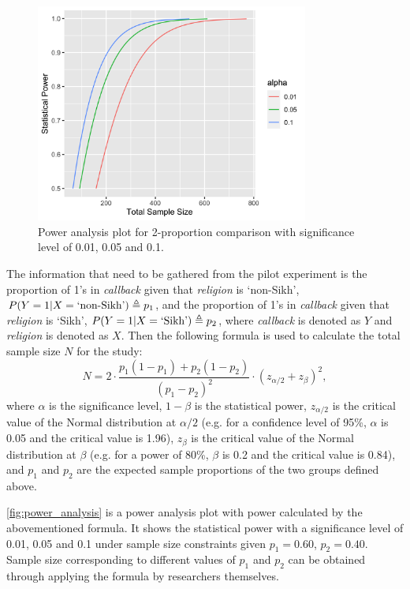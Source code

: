 \documentclass[11pt]{article}
\begin{document}
\begin{figure}[!b] 
    \centering
    \includegraphics[width=0.8\textwidth]{../../Plots/power_analysis.png}
    \caption{Power analysis plot for 2-proportion comparison with significance level of 0.01, 0.05 and 0.1.}
    \label{fig:power_analysis}
\end{figure} 


The information that need to be gathered from the pilot experiment is the proportion of 1's in 
\textit{callback} given that \textit{religion} is `non-Sikh', $P(Y=1|X=\textnormal{`non-Sikh'}) \triangleq p_1$, and the proportion of 1's in  \textit{callback} given that \textit{religion} is `Sikh', $P(Y=1|X=\textnormal{`Sikh'}) \triangleq p_2$, where \textit{callback} is denoted as $Y$ and \textit{religion} is denoted as $X$. Then the following formula is used to calculate the total sample size $N$ for the study:
\begin{equation}
    N = 2\cdot \frac{p_1(1-p_1)+p_2(1-p_2)}{(p_1-p_2)^2} \cdot (z_{\alpha/2}+z_\beta)^2 ,
\end{equation}
where $\alpha$ is the significance level, $1-\beta$ is the statistical power, $z_{\alpha/2}$ is the critical value of the Normal distribution at $\alpha/2$ (e.g. for a confidence level of 95\%, $\alpha$ is 0.05 and the critical value is 1.96), $z_\beta$ is the critical value of the Normal distribution at $\beta$ (e.g. for a power of 80\%, $\beta$ is 0.2 and the critical value is 0.84), and $p_1$ and $p_2$ are the expected sample proportions of the two groups defined above.

\autoref{fig:power_analysis} is a power analysis plot with power calculated by the abovementioned formula. It shows the statistical power with a significance level of 0.01, 0.05 and 0.1 under sample size constraints given $p_1=0.60$, $p_2=0.40$. Sample size corresponding to different values of $p_1$ and $p_2$ can be obtained through applying the formula by researchers themselves.
\end{document}
